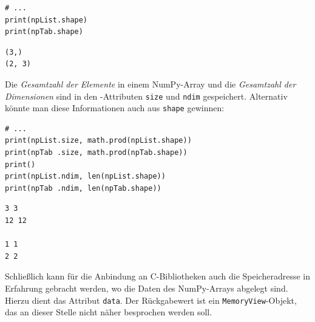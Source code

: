 \begin{tcbraster}[raster columns=2,
                  raster equal height,
                  nobeforeafter,
                  raster column skip=0.5cm]
\begin{codebox}
\begin{verbatim}
# ...
print(npList.shape)
print(npTab.shape)
\end{verbatim}
\end{codebox}
%
\begin{cmdbox}
\begin{verbatim}
(3,)
(2, 3)
\end{verbatim}
\end{cmdbox}
\end{tcbraster}

Die \emph{Gesamtzahl der Elemente} in einem NumPy-Array und die \emph{Gesamtzahl der Dimensionen} sind in den -Attributen \texttt{size} und \texttt{ndim} gespeichert. Alternativ könnte man diese Informationen auch aus \texttt{shape} gewinnen:

\begin{codebox}[Beispiel: Anzahl Elemente \& Dimensionen, width=.6\linewidth, nobeforeafter, equal height group = grpXmpSimpleNDimsElements]
\begin{verbatim}
# ...
print(npList.size, math.prod(npList.shape))
print(npTab .size, math.prod(npTab.shape))
print()
print(npList.ndim, len(npList.shape))
print(npTab .ndim, len(npTab.shape))
\end{verbatim}
\end{codebox}
%
\begin{cmdbox}[Anzahl Elemente \& Dimensionen, width=.4\linewidth, nobeforeafter, equal height group = grpXmpSimpleNDimsElements]
\begin{verbatim}
3 3
12 12

1 1
2 2
\end{verbatim}
\end{cmdbox}

Schließlich kann für die Anbindung an C-Bibliotheken auch die Speicheradresse in Erfahrung gebracht werden, wo die Daten des NumPy-Arrays abgelegt sind. Hierzu dient das Attribut \texttt{data}. Der Rückgabewert ist ein \texttt{MemoryView}-Objekt, das an dieser Stelle nicht näher besprochen werden soll.

